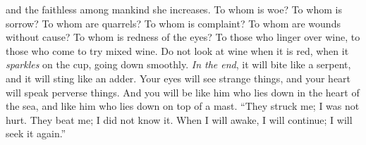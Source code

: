 \begin{biblechapter}
and the faithless among mankind she increases.
\verse To whom is woe? To whom is sorrow? To whom are quarrels? To whom is complaint? 
To whom are wounds without cause? To whom is redness of the eyes?
\verse To those who linger over wine, 
to those who come to try mixed wine.
\verse Do not look at wine when it is red, 
when it \textit{sparkles} on the cup, 
going down smoothly.
\verse \textit{In the end}, it will bite like a serpent, 
and it will sting like an adder.
\verse Your eyes will see strange things, 
and your heart will speak perverse things.
\verse And you will be like him who lies down in the heart of the sea, 
and like him who lies down on top of a mast.
\verse “They struck me; I was not hurt. They beat me; I did not know it. 
When I will awake, I will continue; I will seek it again.”
\end{biblechapter}

